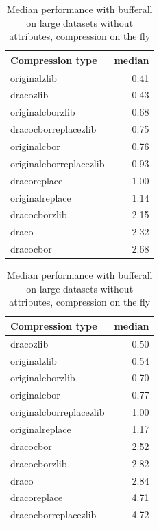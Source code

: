 \begin{table}[!h]
    \begin{minipage}{.5\linewidth}
      \caption{
Median performance with bufferall on large datasets, compression on the fly}
\centering

\begin{tabular}{|l|r|}
\hline
Compression type & median\\
\hline
originalzlib & 0.41\\
\hline
dracozlib & 0.43\\
\hline
originalcborzlib & 0.68\\
\hline
dracocborreplacezlib & 0.75\\
\hline
originalcbor & 0.76\\
\hline
originalcborreplacezlib & 0.93\\
\hline
dracoreplace & 1.00\\
\hline
originalreplace & 1.14\\
\hline
dracocborzlib & 2.15\\
\hline
draco & 2.32\\
\hline
dracocbor & 2.68\\
\hline
\end{tabular}
\end{minipage}%
    \begin{minipage}{.5\linewidth}
      \centering
        \caption{
Median performance with bufferall on large datasets without attributes, compression on the fly}

\begin{tabular}{|l|r|}
\hline
Compression type & median\\
\hline
dracozlib & 0.50\\
\hline
originalzlib & 0.54\\
\hline
originalcborzlib & 0.70\\
\hline
originalcbor & 0.77\\
\hline
originalcborreplacezlib & 1.00\\
\hline
originalreplace & 1.17\\
\hline
dracocbor & 2.52\\
\hline
dracocborzlib & 2.82\\
\hline
draco & 2.84\\
\hline
dracoreplace & 4.71\\
\hline
dracocborreplacezlib & 4.72\\
\hline
\end{tabular}
\end{minipage} 
\end{table}

